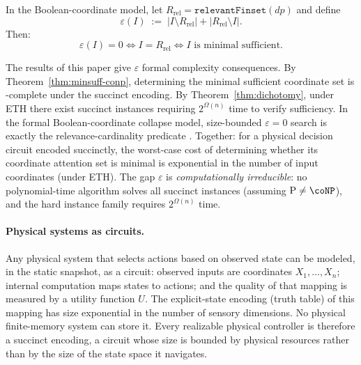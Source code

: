 \begin{proposition}
\label{prop:representation-gap}
In the Boolean-coordinate model, let $R_{\mathrm{rel}}=\texttt{relevantFinset}(dp)$ and define
\[
\varepsilon(I)\;:=\;|I\setminus R_{\mathrm{rel}}| + |R_{\mathrm{rel}}\setminus I|.
\]
Then:
\[
\varepsilon(I)=0 \iff I=R_{\mathrm{rel}}
\iff I \text{ is minimal sufficient}.
\]
\end{proposition}

The results of this paper give $\varepsilon$ formal complexity consequences. By Theorem~\ref{thm:minsuff-conp}, determining the minimal sufficient coordinate set is \coNP-complete under the succinct encoding. By Theorem~\ref{thm:dichotomy}, under ETH there exist succinct instances requiring $2^{\Omega(n)}$ time to verify sufficiency. In the formal Boolean-coordinate collapse model, size-bounded $\varepsilon=0$ search is exactly the relevance-cardinality predicate . Together: for a physical decision circuit encoded succinctly, the worst-case cost of determining whether its coordinate attention set is minimal is exponential in the number of input coordinates (under ETH). The gap $\varepsilon$ is \emph{computationally irreducible}: no polynomial-time algorithm solves all succinct instances (assuming $\mathrm{P} \neq \coNP$), and the hard instance family requires $2^{\Omega(n)}$ time.

\paragraph{Physical systems as circuits.}
Any physical system that selects actions based on observed state can be modeled, in the static snapshot, as a circuit: observed inputs are coordinates $X_1, \ldots, X_n$; internal computation maps states to actions; and the quality of that mapping is measured by a utility function $U$.
The explicit-state encoding (truth table) of this mapping has size exponential in the number of sensory dimensions.
No physical finite-memory system can store it.
Every realizable physical controller is therefore a succinct encoding, a circuit whose size is bounded by physical resources rather than by the size of the state space it navigates.

